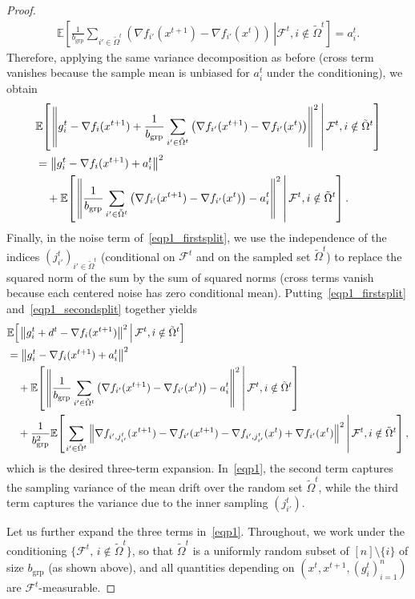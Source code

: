 \documentclass{article}
\newcommand{\sqn}[1]{\left\| #1 \right\|^2}
\newcommand{\Expb}[2]{\mathbb{E}\!\left[\left. #1\,\right|#2 \right]}
\theoremstyle{plain}
\begin{document}
\begin{proof}
\begin{align*}
\Expb{\frac{1}{b_{\mathrm{grp}}}\sum_{i'\in \tilde{\Omega}^t}\left(\nabla f_{i'}(x^{t+1})-\nabla f_{i'}(x^{t})\right)}{\mathcal{F}^t, i\notin\tilde{\Omega}^t}
=a_i^t.
\end{align*}
Therefore, applying the same variance decomposition as before (cross term vanishes because the sample mean is unbiased for $a_i^t$ under the conditioning), we obtain
\begin{align}
&\Expb{\sqn{g_i^{t}-\nabla f_i(x^{t+1})+\frac{1}{b_{\mathrm{grp}}}\sum_{i'\in \tilde{\Omega}^t}\left(\nabla f_{i'}(x^{t+1})-\nabla f_{i'}(x^{t})\right)}}{\mathcal{F}^t, i\notin\tilde{\Omega}^t}\notag\\
&=\sqn{g_i^{t}-\nabla f_i(x^{t+1})+a_i^t} \notag\\
&\quad +\Expb{\sqn{\frac{1}{b_{\mathrm{grp}}}\sum_{i'\in \tilde{\Omega}^t}\left( \nabla f_{i'}(x^{t+1})-\nabla f_{i'}(x^{t})\right)-a_i^t}}{\mathcal{F}^t, i\notin\tilde{\Omega}^t}.
\label{eqp1_secondsplit}
\end{align}
Finally, in the noise term of~\eqref{eqp1_firstsplit}, we use the independence of the indices $(j_{i'}^t)_{i'\in\tilde{\Omega}^t}$ (conditional on $\mathcal{F}^t$ and on the sampled set $\tilde{\Omega}^t$) to replace the squared norm of the sum by the sum of squared norms (cross terms vanish because each centered noise has zero conditional mean). Putting~\eqref{eqp1_firstsplit} and~\eqref{eqp1_secondsplit} together yields
\begin{align}
&\Expb{\sqn{g_i^{t}+d^t-\nabla f_i(x^{t+1})}}{\mathcal{F}^t, i\notin\tilde{\Omega}^t}\notag\\
&=\sqn{g_i^{t}-\nabla f_i(x^{t+1})+a_i^t}\notag\\
&\quad+\Expb{\sqn{\frac{1}{b_{\mathrm{grp}}}\sum_{i'\in \tilde{\Omega}^t}\left( \nabla f_{i'}(x^{t+1})-\nabla f_{i'}(x^{t})\right)-a_i^t}}{\mathcal{F}^t, i\notin\tilde{\Omega}^t}\notag\\
&\quad +\frac{1}{b_{\mathrm{grp}}^2} \Expb{\sum_{i'\in \tilde{\Omega}^t} \sqn{\nabla f_{i',j_{i'}^t}(x^{t+1})- \nabla f_{i'}(x^{t+1})-\nabla f_{i',j_{i'}^t}(x^{t})+\nabla f_{i'}(x^{t})}}{\mathcal{F}^t, i\notin\tilde{\Omega}^t},
\label{eqp1}
\end{align}
which is the desired three-term expansion. In~\eqref{eqp1}, the second term captures the sampling variance of the mean drift over the random set $\tilde{\Omega}^t$, while the third term captures the variance due to the inner sampling $(j_{i'}^t)$.

Let us further expand the three terms in~\eqref{eqp1}. Throughout, we work under the conditioning
$\{\mathcal{F}^t,\, i\notin\tilde{\Omega}^t\}$, so that $\tilde{\Omega}^t$ is a uniformly random subset of $[n]\setminus\{i\}$ of size $b_{\mathrm{grp}}$ (as shown above), and all quantities depending on $(x^t,x^{t+1},(g_i^t)_{i=1}^n)$ are $\mathcal{F}^t$-measurable.


\end{proof}
\end{document}
